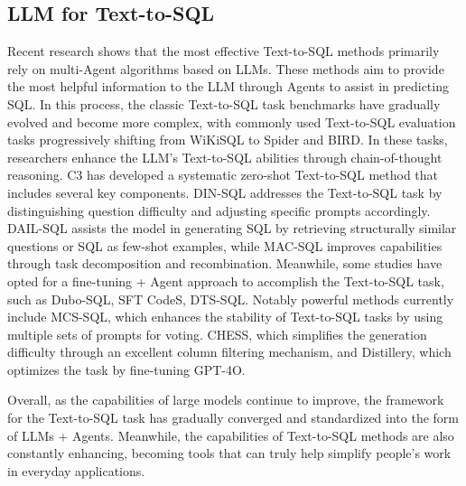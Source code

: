 \subsection{LLM for Text-to-SQL}
Recent research shows that the most effective Text-to-SQL methods primarily rely on multi-Agent algorithms based on LLMs. These methods aim to provide the most helpful information to the LLM through Agents to assist in predicting SQL. In this process, the classic Text-to-SQL task benchmarks have gradually evolved and become more complex, with commonly used Text-to-SQL evaluation tasks progressively shifting from WiKiSQL\cite{wikisql} to Spider\cite{spider} and BIRD\cite{Bird}.
In these tasks, researchers\cite{tai2023exploring} enhance the LLM's Text-to-SQL abilities through chain-of-thought reasoning. C3\cite{c3} has developed a systematic zero-shot Text-to-SQL method that includes several key components. DIN-SQL\cite{dinsql} addresses the Text-to-SQL task by distinguishing question difficulty and adjusting specific prompts accordingly. DAIL-SQL\cite{DAILsQL} assists the model in generating SQL by retrieving structurally similar questions or SQL as few-shot examples, while MAC-SQL improves capabilities through task decomposition and recombination. Meanwhile, some studies have opted for a fine-tuning + Agent approach to accomplish the Text-to-SQL task, such as Dubo-SQL\cite{dubo}, SFT CodeS\cite{codes}, DTS-SQL\cite{dtssql}. Notably powerful methods currently include MCS-SQL\cite{mcssql}, which enhances the stability of Text-to-SQL tasks by using multiple sets of prompts for voting. CHESS\cite{chess}, which simplifies the generation difficulty through an excellent column filtering mechanism, and Distillery\cite{Distilgpt4}, which optimizes the task by fine-tuning GPT-4O.


Overall, as the capabilities of large models continue to improve, the framework for the Text-to-SQL task has gradually converged and standardized into the form of LLMs + Agents. Meanwhile, the capabilities of Text-to-SQL methods are also constantly enhancing, becoming tools that can truly help simplify people's work in everyday applications.